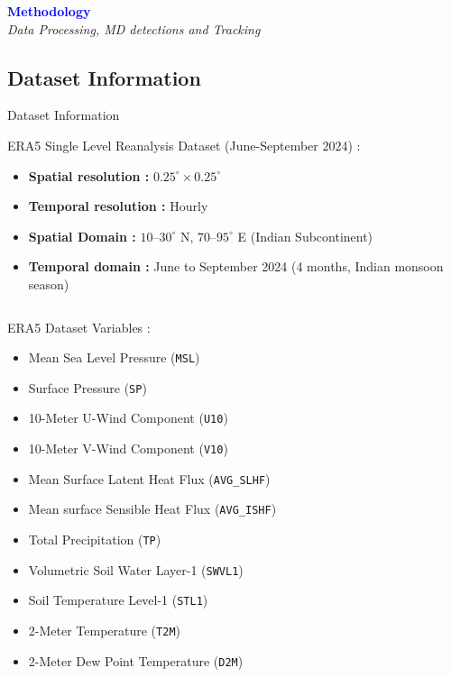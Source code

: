 \begin{frame}
	\begin{center}
		\Huge \textcolor{blue}{\textbf{Methodology}} \\
		\vspace{0.5cm}
		\large \textit{Data Processing, MD detections and Tracking}
	\end{center}
\end{frame}

\subsection{Dataset Information}
\begin{frame}{Dataset Information}
	\vspace{-0.1cm}
	\begin{block}{ERA5 Single Level Reanalysis Dataset (June-September 2024) \tiny \cite{hersbach2020era5} :}
		\footnotesize
		\begin{itemize}
			\item \textbf{Spatial resolution :} \texttt{$0.25^\circ \times 0.25^\circ$}
			\item \textbf{Temporal resolution :} Hourly
			\item \textbf{Spatial Domain :} $10$--$30^\circ$ N, $70$--$95^\circ$ E (Indian Subcontinent)
			\item \textbf{Temporal domain :} June to September 2024 (4 months, Indian monsoon season)
		\end{itemize}
	\end{block}

	\vspace{-0.2cm}
	\begin{columns}[T, totalwidth=0.9\textwidth]
		\begin{block}{ERA5 Dataset Variables :}
			\begin{itemize}\footnotesize
				\item Mean Sea Level Pressure (\texttt{MSL})
				\item Surface Pressure (\texttt{SP})
				\item 10-Meter U-Wind Component (\texttt{U10})
				\item 10-Meter V-Wind Component (\texttt{V10})
				\item Mean Surface Latent Heat Flux (\texttt{AVG\_SLHF})
				\item Mean surface Sensible Heat Flux (\texttt{AVG\_ISHF})
				\item Total Precipitation (\texttt{TP})
				\item Volumetric Soil Water Layer-1 (\texttt{SWVL1})
				\item Soil Temperature Level-1 (\texttt{STL1})
				\item 2-Meter Temperature (\texttt{T2M})
				\item 2-Meter Dew Point Temperature (\texttt{D2M})
			\end{itemize}
		\end{block}


\end{columns}
\end{frame}
